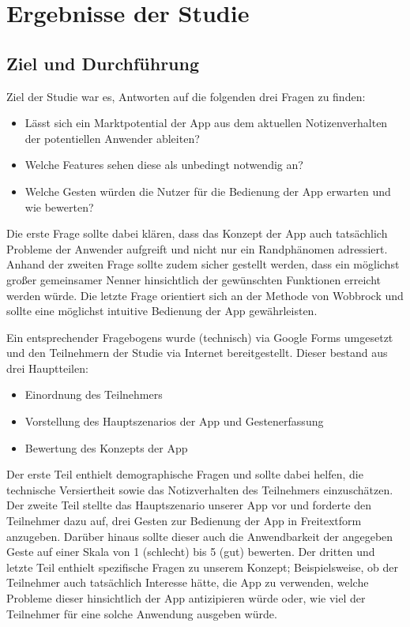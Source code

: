 \documentclass{chi-ext}
\begin{document}
\section{Ergebnisse der Studie}

\subsection{Ziel und Durchführung}
Ziel der Studie war es, Antworten auf die folgenden drei Fragen zu finden:
\begin{itemize}
\item Lässt sich ein Marktpotential der App aus dem aktuellen Notizenverhalten der potentiellen Anwender ableiten?
\item Welche Features sehen diese als unbedingt notwendig an?
\item Welche Gesten würden die Nutzer für die Bedienung der App erwarten und wie bewerten?
\end{itemize}

Die erste Frage sollte dabei klären, dass das Konzept der App auch tatsächlich Probleme der Anwender aufgreift und nicht nur ein Randphänomen adressiert. Anhand der zweiten Frage sollte zudem sicher gestellt werden, dass ein möglichst großer gemeinsamer Nenner hinsichtlich der gewünschten Funktionen erreicht werden würde. Die letzte Frage orientiert sich an der Methode von Wobbrock und sollte eine möglichst intuitive Bedienung der App gewährleisten.

Ein entsprechender Fragebogens wurde (technisch) via Google Forms umgesetzt und den Teilnehmern der Studie via Internet bereitgestellt. Dieser bestand aus drei Hauptteilen:

\begin{itemize}
\item Einordnung des Teilnehmers
\item Vorstellung des Hauptszenarios der App und Gestenerfassung
\item Bewertung des Konzepts der App
\end{itemize}

Der erste Teil enthielt demographische Fragen und sollte dabei helfen, die technische Versiertheit sowie das Notizverhalten des Teilnehmers einzuschätzen.
Der zweite Teil stellte das Hauptszenario unserer App vor und forderte den Teilnehmer dazu auf, drei Gesten zur Bedienung der App in Freitextform anzugeben. Darüber hinaus sollte dieser auch die Anwendbarkeit der angegeben Geste auf einer Skala von 1 (schlecht) bis 5 (gut) bewerten.
Der dritten und letzte Teil enthielt spezifische Fragen zu unserem Konzept; Beispielsweise, ob der Teilnehmer auch tatsächlich Interesse hätte, die App zu verwenden, welche Probleme dieser hinsichtlich der App antizipieren würde oder, wie viel der Teilnehmer für eine solche Anwendung ausgeben würde.
\end{document}
